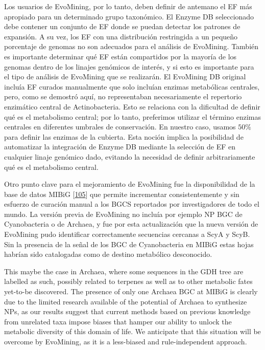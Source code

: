\documentclass[12pt,twoside]{reedthesis}
\begin{document}
  Los usuarios de EvoMining, por lo tanto, deben definir de antemano el EF
  más apropiado para un determinado grupo taxonómico. El Enzyme DB
  seleccionado debe contener un conjunto de EF donde se puedan detectar
  los patrones de expansión. A su vez, los EF con una distribución
  restringida a un pequeño porcentaje de genomas no son adecuados para el
  análisis de EvoMining. También es importante determinar qué EF están
  compartidos por la mayoría de los genomas dentro de los linajes
  genómicos de interés, y si esto es importante para el tipo de análisis
  de EvoMining que se realizarán. El EvoMining DB original incluía EF
  curados manualmente que solo incluían enzimas metabólicas centrales,
  pero, como se demostró aquí, no representaban necesariamente el
  repertorio enzimático central de Actinobacteria. Esto se relaciona con
  la dificultad de definir qué es el metabolismo central; por lo tanto,
  preferimos utilizar el término enzimas centrales en diferentes umbrales
  de conservación. En nuestro caso, usamos \(50\%\) para definir las
  enzimas de la cubierta. Esta noción implica la posibilidad de
  automatizar la integración de Enzyme DB mediante la selección de EF en
  cualquier linaje genómico dado, evitando la necesidad de definir
  arbitrariamente qué es el metabolismo central.
  
  Otro punto clave para el mejoramiento de EvoMining fue la disponibilidad
  de la base de datos MIBiG
  {[}\protect\hyperlink{ref-medema_minimum_2015}{105}{]} que permite
  incrementar consistentemente y sin esfuerzo de curación manual a los
  BGCS reportados por investigadores de todo el mundo. La versión previa
  de EvoMining no incluía por ejemplo NP BGC de Cyanobacteria o de
  Archaea, y fue por esta actualización que la nueva versión de EvoMining
  pudo identificar correctamente secuencias cercanas a ScyA y ScyB. Sin la
  presencia de la señal de los BGC de Cyanobacteria en MIBiG estas hojas
  habrían sido catalogadas como de destino metabólico desconocido.
  
  This maybe the case in Archaea, where some sequences in the GDH tree are
  labelled as such, possibly related to terpenes as well as to other
  metabolic fates yet-to-be discovered. The presence of only one Archaea
  BGC at MIBiG is clearly due to the limited research available of the
  potential of Archaea to synthesize NPs, as our results suggest that
  current methods based on previous knowledge from unrelated taxa impose
  biases that hamper our ability to unlock the metabolic diversity of this
  domain of life. We anticipate that this situation will be overcome by
  EvoMining, as it is a less-biased and rule-independent approach.
  
\end{document}
